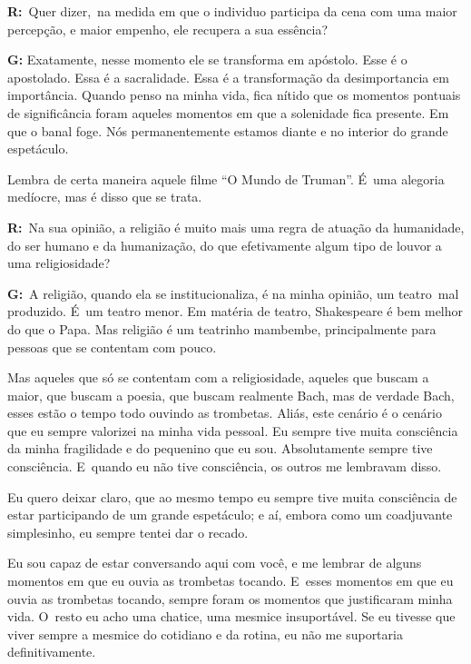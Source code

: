  

\textbf{R:}~Quer dizer,\textbf{}~na medida em que o individuo participa
da cena com uma maior percepção, e maior empenho, ele recupera a sua
essência?

 

\textbf{G:} Exatamente, nesse momento ele se transforma em apóstolo.
Esse é o apostolado. Essa é a sacralidade. Essa é a transformação da
desimportancia em importância. Quando penso na minha vida, fica nítido
que os momentos pontuais de significância foram aqueles momentos em que
a solenidade fica presente. Em que o banal foge. Nós permanentemente
estamos diante e no interior do grande espetáculo.

 

Lembra de certa maneira aquele filme ``O Mundo de Truman''. É~uma
alegoria medíocre, mas é disso que se trata.

 

\textbf{R:}~Na sua opinião, a religião é muito mais uma regra de atuação
da humanidade, do ser humano e da humanização, do que efetivamente algum
tipo de louvor a uma religiosidade?

 

\textbf{G:}~A religião, quando ela se institucionaliza, é na minha
opinião, um teatro\textbf{}~mal produzido. É~um teatro menor. Em matéria
de teatro, Shakespeare é bem melhor do que o Papa. Mas religião é um
teatrinho mambembe, principalmente para pessoas que se contentam com
pouco.

 

Mas aqueles que só se contentam com a religiosidade, aqueles que buscam
a maior, que buscam a poesia, que buscam realmente Bach, mas de verdade
Bach, esses estão o tempo todo ouvindo as trombetas. Aliás, este cenário
é o cenário que eu sempre valorizei na minha vida pessoal. Eu sempre
tive muita consciência da minha fragilidade e do pequenino que eu sou.
Absolutamente sempre tive consciência. E~quando eu não tive consciência,
os outros me lembravam disso.

 

Eu quero deixar claro, que ao mesmo tempo eu sempre tive muita
consciência de estar participando de um grande espetáculo; e aí, embora
como um coadjuvante simplesinho, eu sempre tentei dar o recado.

 

Eu sou capaz de estar conversando aqui com você, e me lembrar de alguns
momentos em que eu ouvia as trombetas tocando. E~esses momentos em que
eu ouvia as trombetas tocando, sempre foram os momentos que justificaram
minha vida. O~resto eu acho uma chatice, uma mesmice insuportável. Se eu
tivesse que viver sempre a mesmice do cotidiano e da rotina, eu não me
suportaria definitivamente.

